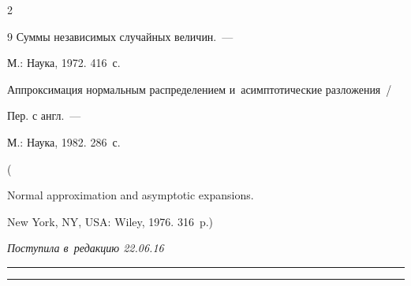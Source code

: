 \begin{multicols}{2}
{{\begin{thebibliography}{9}
  Суммы независимых случайных величин.~---


  М.: Наука, 1972. 416~с.






  Аппроксимация нормальным распределением и~асимптотические разложения~/


  Пер. с англ.~--- 


  М.: Наука, 1982. 286~с.


  (


{Normal approximation and asymptotic expansions}. 


New York, NY, USA: Wiley, 1976. 316~p.)


  \end{thebibliography}





 }


 }





\end{multicols}





\vspace*{-3pt}





\hfill{\small\textit{Поступила в~редакцию 22.06.16}}





\vspace*{10pt}















\hrule





\vspace*{2pt}





\hrule





